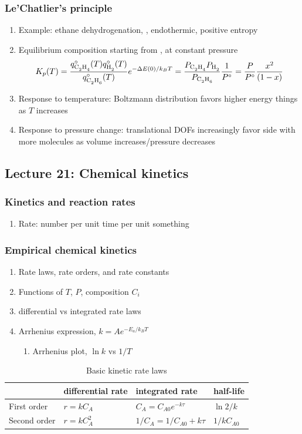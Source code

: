 \documentclass[11pt]{article}
\begin{document}
\subsubsection{Le'Chatlier's principle}
\label{sec:org9177112}
\begin{enumerate}
\item Example: ethane dehydrogenation, , endothermic, positive entropy
\item Equilibrium composition starting from , at constant pressure
\[ K_p(T) = \frac{q_{\ce{C2H4}}^\circ(T) q_{\ce{H2}}^\circ(T)}{q_{\ce{C2H6}}^\circ(T)} e^{-\Delta E(0)/k_BT} =  \frac{P_{\ce{C2H4}}P_{\ce{H2}}}{P_{\ce{C2H6}}}\frac{1}{P^\circ} = \frac{P}{P^\circ}\frac{x^2}{(1-x)} \]
\item Response to temperature: Boltzmann distribution favors higher energy things as \(T\) increases
\item Response to pressure change: translational DOFs increasingly favor side with more molecules as volume increases/pressure decreases
\end{enumerate}
\subsection{Lecture 21: Chemical kinetics}
\label{sec:orgd608692}
\subsubsection{Kinetics and reaction rates}
\label{sec:orgf5cf74e}
\begin{enumerate}
\item Rate: number per unit time per unit something
\end{enumerate}
\subsubsection{Empirical chemical kinetics}
\label{sec:orgcabe140}
\begin{enumerate}
\item Rate laws, rate orders, and rate constants
\item Functions of \(T\), \(P\), composition \(C_i\)
\item differential vs integrated rate laws
\item Arrhenius expression, \(k=A e^{-E_a/k_BT}\)
\begin{enumerate}
\item Arrhenius plot, \(\ln k\) vs \(1/T\)
\end{enumerate}
\end{enumerate}
\begin{table}[htbp]
\caption{Basic kinetic rate laws}
\centering
\begin{tabular}{llll}
\hline
 & differential rate & integrated rate & half-life\\
\hline
First order & \(r = kC_A\) & \(C_A = C_{A0} e^{-k \tau}\) & \(\ln 2/k\)\\
Second order & \(r = kC_A^2\) & \(1/C_A = 1/C_{A0} + k \tau\) & \(1/kC_{A0}\)\\
\end{tabular}
\end{table}
\end{document}
